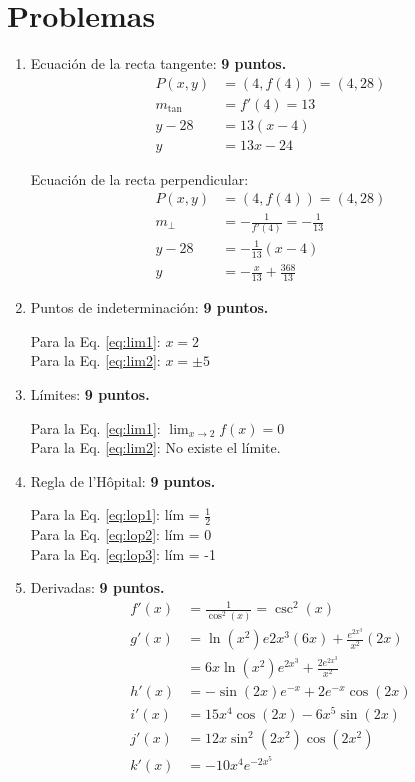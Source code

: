 \documentclass{article}
\begin{document}
\section{Problemas} %
\label{sec:resproblemas}
\begin{enumerate}

\item Ecuación de la recta tangente:
\hfill \textbf{9 puntos.}
\begin{align*}
P(x,y) &= (4,f(4)) = (4,28) \\
m_{\tan} &= f'(4) = 13 \\
y - 28 &= 13(x-4) \\
y &= 13x -24
\end{align*}

Ecuación de la recta perpendicular:
\begin{align*}
P(x,y) &= (4,f(4)) = (4,28) \\
m_{\perp} &=- \frac{1}{f'(4)} =-\frac{1}{13} \\
y - 28 &= -\frac{1}{13}(x-4) \\
y &= - \frac{x}{13} + \frac{368}{13}
\end{align*}

\item Puntos de indeterminación: 
\hfill \textbf{9 puntos.}

Para la Eq. \eqref{eq:lim1}: $x=2$ \\
Para la Eq. \eqref{eq:lim2}: $x = \pm 5$

\item Límites: 
\hfill \textbf{9 puntos.}

Para la Eq. \eqref{eq:lim1}: $\lim_{x \rightarrow 2}f(x) = 0$ \\
Para la Eq. \eqref{eq:lim2}: No existe el límite.

\item Regla de l'H\^opital:
\hfill \textbf{9 puntos.}

Para la Eq. \eqref{eq:lop1}: lím = $\frac{1}{2}$  \\
Para la Eq. \eqref{eq:lop2}: lím = 0  \\
Para la Eq. \eqref{eq:lop3}: lím = -1 

\item Derivadas:
\hfill \textbf{9 puntos.}
\begin{align*}
f'(x) &= \frac{1}{\cos^2(x)} = \csc^{2}(x) \\
g'(x) &= \ln(x^{2})e{2x^{3}}(6x) + \frac{e^{2x^{3}}}{x^2}(2x) \\
      &= 6x \ln(x^{2})e^{2x^{3}} + \frac{2e^{2x^3}}{x^2} \\
h'(x) &= - \sin(2x)e^{-x} + 2e^{-x} \cos{(2x)} \\
i'(x) &= 15x^{4} \cos(2x) -6x^{5}\sin(2x) \\
j'(x) &= 12x \sin^{2}(2x^{2}) \cos(2x^{2}) \\
k'(x) &= -10x^{4}e^{-2x^{5}}
\end{align*}


\end{enumerate}
\end{document}
